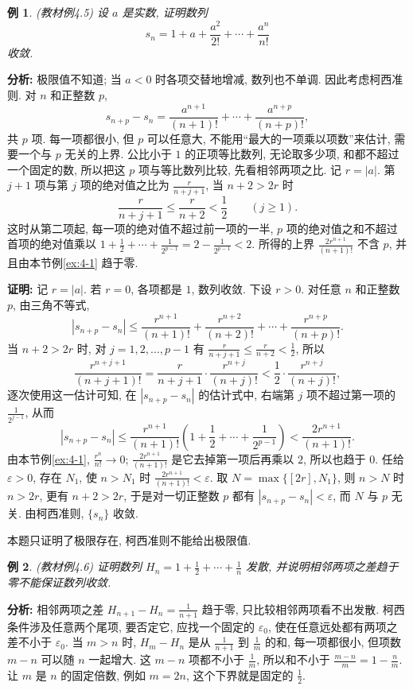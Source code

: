 \documentclass[UTF8,openany]{ctexbook}
\theoremstyle{chinesetextbook}
\newtheorem{example}{例}[section]
\newenvironment{cnproof}{\par\indent\textbf{证明:} \ignorespaces}{\par}
\begin{document}
\begin{example}\label{ex:4-5}
\textnormal{(教材例4.5)} 设 $a$ 是实数, 证明数列
\[
s_n=1+a+\frac{a^2}{2!}+\cdots+\frac{a^n}{n!}
\]
收敛.
\end{example}
\par\indent\textbf{分析:} 极限值不知道; 当 $a<0$ 时各项交替地增减, 数列也不单调. 因此考虑柯西准则. 对 $n$ 和正整数 $p$,
\[
s_{n+p}-s_n=\frac{a^{n+1}}{(n+1)!}+\cdots+\frac{a^{n+p}}{(n+p)!},
\]
共 $p$ 项. 每一项都很小, 但 $p$ 可以任意大, 不能用“最大的一项乘以项数”来估计, 需要一个与 $p$ 无关的上界. 公比小于 $1$ 的正项等比数列, 无论取多少项, 和都不超过一个固定的数, 所以把这 $p$ 项与等比数列比较, 先看相邻两项之比. 记 $r=|a|$. 第 $j+1$ 项与第 $j$ 项的绝对值之比为 $\displaystyle\frac r{n+j+1}$, 当 $n+2>2r$ 时
\[
\frac r{n+j+1}\le\frac r{n+2}<\frac12\qquad(j\ge1).
\]
这时从第二项起, 每一项的绝对值不超过前一项的一半, $p$ 项的绝对值之和不超过首项的绝对值乘以 $\displaystyle1+\frac12+\cdots+\frac1{2^{p-1}}=2-\frac1{2^{p-1}}<2$. 所得的上界 $\displaystyle\frac{2r^{n+1}}{(n+1)!}$ 不含 $p$, 并且由本节例\ref{ex:4-1} 趋于零.
\begin{cnproof}
记 $r=|a|$. 若 $r=0$, 各项都是 $1$, 数列收敛. 下设 $r>0$. 对任意 $n$ 和正整数 $p$, 由三角不等式,
\[
|s_{n+p}-s_n|\le\frac{r^{n+1}}{(n+1)!}+\frac{r^{n+2}}{(n+2)!}+\cdots+\frac{r^{n+p}}{(n+p)!}.
\]
当 $n+2>2r$ 时, 对 $j=1,2,\ldots,p-1$ 有 $\displaystyle\frac r{n+j+1}\le\frac r{n+2}<\frac12$, 所以
\[
\frac{r^{n+j+1}}{(n+j+1)!}=\frac r{n+j+1}\cdot\frac{r^{n+j}}{(n+j)!}<\frac12\cdot\frac{r^{n+j}}{(n+j)!},
\]
逐次使用这一估计可知, 在 $|s_{n+p}-s_n|$ 的估计式中, 右端第 $j$ 项不超过第一项的 $\displaystyle\frac1{2^{j-1}}$, 从而
\[
|s_{n+p}-s_n|\le\frac{r^{n+1}}{(n+1)!}\left(1+\frac12+\cdots+\frac1{2^{p-1}}\right)<\frac{2r^{n+1}}{(n+1)!}.
\]
由本节例\ref{ex:4-1}, $\displaystyle\frac{r^n}{n!}\to0$; $\displaystyle\frac{2r^{n+1}}{(n+1)!}$ 是它去掉第一项后再乘以 $2$, 所以也趋于 $0$. 任给 $\varepsilon>0$, 存在 $N_1$, 使 $n>N_1$ 时 $\displaystyle\frac{2r^{n+1}}{(n+1)!}<\varepsilon$. 取 $N=\max\{[2r],N_1\}$, 则 $n>N$ 时 $n>2r$, 更有 $n+2>2r$, 于是对一切正整数 $p$ 都有 $|s_{n+p}-s_n|<\varepsilon$, 而 $N$ 与 $p$ 无关. 由柯西准则, $\{s_n\}$ 收敛.
\end{cnproof}
本题只证明了极限存在, 柯西准则不能给出极限值.
\begin{example}\label{ex:4-6}
\textnormal{(教材例4.6)} 证明数列 $\displaystyle H_n=1+\frac12+\cdots+\frac1n$ 发散, 并说明相邻两项之差趋于零不能保证数列收敛.
\end{example}
\par\indent\textbf{分析:} 相邻两项之差 $\displaystyle H_{n+1}-H_n=\frac1{n+1}$ 趋于零, 只比较相邻两项看不出发散. 柯西条件涉及任意两个尾项, 要否定它, 应找一个固定的 $\varepsilon_0$, 使在任意远处都有两项之差不小于 $\varepsilon_0$. 当 $m>n$ 时, $H_m-H_n$ 是从 $\displaystyle\frac1{n+1}$ 到 $\displaystyle\frac1m$ 的和, 每一项都很小, 但项数 $m-n$ 可以随 $n$ 一起增大. 这 $m-n$ 项都不小于 $\displaystyle\frac1m$, 所以和不小于 $\displaystyle\frac{m-n}m=1-\frac nm$. 让 $m$ 是 $n$ 的固定倍数, 例如 $m=2n$, 这个下界就是固定的 $\displaystyle\frac12$.
\end{document}
